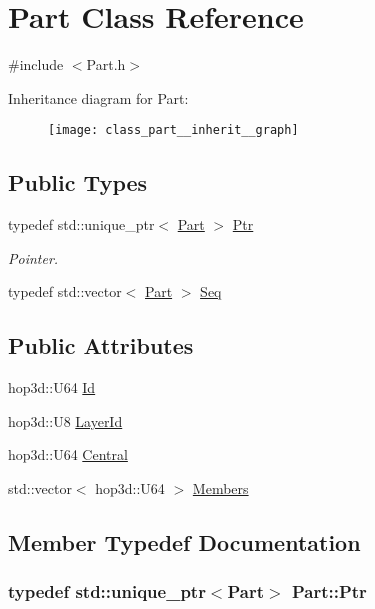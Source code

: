 \hypertarget{class_part}{\section{Part Class Reference}
\label{class_part}
}


{\ttfamily \#include $<$Part.\-h$>$}



Inheritance diagram for Part\-:\nopagebreak
\begin{figure}[H]
\begin{center}
\leavevmode
\texttt{[image: class\_part\_\_inherit\_\_graph]}
\end{center}
\end{figure}
\subsection*{Public Types}
\begin{DoxyCompactItemize}
\item 
typedef std\-::unique\-\_\-ptr$<$ \hyperlink{class_part}{Part} $>$ \hyperlink{class_part_a270255868bbd294da6cdbe1a22fd71c0}{Ptr}
\begin{DoxyCompactList}\small\item\em Pointer. \end{DoxyCompactList}\item 
typedef std\-::vector$<$ \hyperlink{class_part}{Part} $>$ \hyperlink{class_part_a9cbb31df0bd4615cb133293acd55a938}{Seq}
\end{DoxyCompactItemize}
\subsection*{Public Attributes}
\begin{DoxyCompactItemize}
\item 
hop3d\-::\-U64 \hyperlink{class_part_a3d19e990ee30d25cd5f12610864300db}{Id}
\item 
hop3d\-::\-U8 \hyperlink{class_part_ac4e9f24ead3926518a74b37c5101efc0}{Layer\-Id}
\item 
hop3d\-::\-U64 \hyperlink{class_part_a1dafacbc907066c3976ca09dc69a7421}{Central}
\item 
std\-::vector$<$ hop3d\-::\-U64 $>$ \hyperlink{class_part_ad5e3891ace1e60c4b0c9b86bad225a38}{Members}
\end{DoxyCompactItemize}


\subsection{Member Typedef Documentation}
\hypertarget{class_part_a270255868bbd294da6cdbe1a22fd71c0}{
\subsubsection[{Ptr}]{\setlength{\rightskip}{0pt plus 5cm}typedef std\-::unique\-\_\-ptr$<${\bf Part}$>$ {\bf Part\-::\-Ptr}}}\label{class_part_a270255868bbd294da6cdbe1a22fd71c0}


